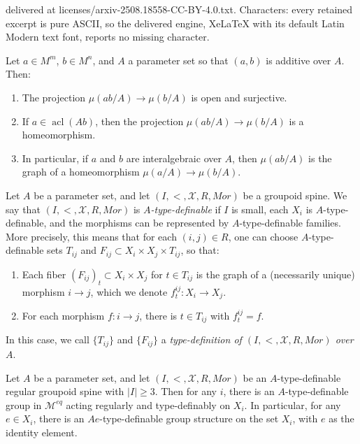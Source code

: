 \documentclass[10pt,a4paper]{amsart}
\newcommand{\acl}{\operatorname{acl}}
\begin{document}
delivered at licenses/arxiv-2508.18558-CC-BY-4.0.txt. Characters: every retained excerpt is pure ASCII, so the delivered engine, XeLaTeX with its default Latin Modern text font, reports no missing character.
\begin{lemma}\label{L: mu generic cont}
    Let $a\in M^m$, $b\in M^n$, and $A$ a parameter set so that $(a,b)$ is additive over $A$. Then: 
    \begin{enumerate}
        \item The projection $\mu(ab/A)\rightarrow\mu(b/A)$ is open and surjective.
        \item If $a\in\acl(Ab)$, then the projection $\mu(ab/A)\rightarrow\mu(b/A)$ is a homeomorphism.
        \item In particular, if $a$ and $b$ are interalgebraic over $A$, then $\mu(ab/A)$ is the graph of a homeomorphism $\mu(a/A)\rightarrow\mu(b/A)$.
    \end{enumerate}
\end{lemma}

\begin{definition}\label{D: weak type def}
    Let $A$ be a parameter set, and let $(I,<,\mathcal X,R,Mor)$ be a groupoid spine. We say that $(I,<,\mathcal X,R,Mor)$ is \textit{$A$-type-definable} if $I$ is small, each $X_i$ is $A$-type-definable, and the morphisms can be represented by $A$-type-definable families. More precisely, this means that for each $(i,j)\in R$, one can choose $A$-type-definable sets $T_{ij}$ and $F_{ij}\subset X_i\times X_j\times T_{ij}$, so that:
    \begin{enumerate}
        \item Each fiber $(F_{ij})_t\subset X_i\times X_j$ for $t\in T_{ij}$ is the graph of a (necessarily unique) morphism $i\rightarrow j$, which we denote $f^{ij}_t:X_i\rightarrow X_j$. 
        \item For each morphism $f:i\rightarrow j$, there is $t\in T_{ij}$ with $f^{ij}_t=f$.
    \end{enumerate}
    In this case, we call $\{T_{ij}\}$ and $\{F_{ij}\}$ a \textit{type-definition of $(I,<,\mathcal X,R,Mor)$ over $A$}.
    \end{definition}

\begin{theorem}\label{T: combinatorial group conf}
    Let $A$ be a parameter set, and let $(I,<,\mathcal X,R,Mor)$ be an $A$-type-definable regular groupoid spine with $|I|\geq 3$. Then for any $i$, there is an $A$-type-definable group in $\mathcal M^{eq}$ acting regularly and type-definably on $X_i$. In particular, for any $e\in X_i$, there is an $Ae$-type-definable group structure on the set $X_i$, with $e$ as the identity element.
\end{theorem}
\end{document}
